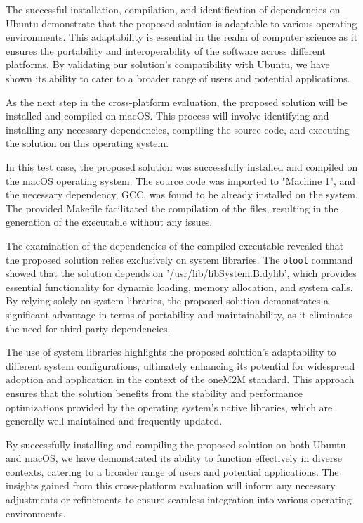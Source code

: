 \documentclass[a4paper,fleqn]{cas-dc}
\begin{document}
The successful installation, compilation, and identification of dependencies on Ubuntu demonstrate that the proposed solution is adaptable to various operating environments. This adaptability is essential in the realm of computer science as it ensures the portability and interoperability of the software across different platforms. By validating our solution's compatibility with Ubuntu, we have shown its ability to cater to a broader range of users and potential applications.

As the next step in the cross-platform evaluation, the proposed solution will be installed and compiled on macOS. This process will involve identifying and installing any necessary dependencies, compiling the source code, and executing the solution on this operating system.

In this test case, the proposed solution was successfully installed and compiled on the macOS operating system. The source code was imported to "Machine 1", and the necessary dependency, GCC, was found to be already installed on the system. The provided Makefile facilitated the compilation of the files, resulting in the generation of the executable without any issues.

The examination of the dependencies of the compiled executable revealed that the proposed solution relies exclusively on system libraries. The \texttt{otool} command showed that the solution depends on '/usr/lib/libSystem.B.dylib', which provides essential functionality for dynamic loading, memory allocation, and system calls. By relying solely on system libraries, the proposed solution demonstrates a significant advantage in terms of portability and maintainability, as it eliminates the need for third-party dependencies.

The use of system libraries highlights the proposed solution's adaptability to different system configurations, ultimately enhancing its potential for widespread adoption and application in the context of the oneM2M standard. This approach ensures that the solution benefits from the stability and performance optimizations provided by the operating system's native libraries, which are generally well-maintained and frequently updated.

By successfully installing and compiling the proposed solution on both Ubuntu and macOS, we have demonstrated its ability to function effectively in diverse contexts, catering to a broader range of users and potential applications. The insights gained from this cross-platform evaluation will inform any necessary adjustments or refinements to ensure seamless integration into various operating environments.
\end{document}
